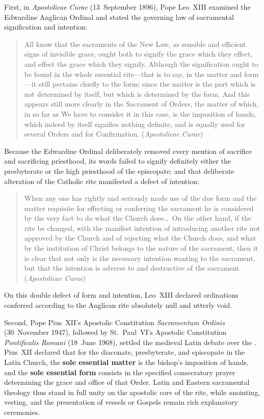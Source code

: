 First, in \emph{Apostolicae Curae} (13~September 1896), Pope Leo~XIII examined the Edwardine Anglican Ordinal and stated the governing law of sacramental signification and intention:
\begin{quotation}
All know that the sacraments of the New Law, as sensible and efficient signs of invisible grace, ought both to signify the grace which they effect, and effect the grace which they signify. Although the signification ought to be found in the whole essential rite---that is to say, in the matter and form---it still pertains chiefly to the form; since the matter is the part which is not determined by itself, but which is determined by the form. And this appears still more clearly in the Sacrament of Orders, the matter of which, in so far as We have to consider it in this case, is the imposition of hands, which indeed by itself signifies nothing definite, and is equally used for several Orders and for Confirmation. (\emph{Apostolicae Curae})
\end{quotation}
Because the Edwardine Ordinal deliberately removed every mention of sacrifice and sacrificing priesthood, its words failed to signify definitely either the presbyterate or the high priesthood of the episcopate; and that deliberate alteration of the Catholic rite manifested a defect of intention:
\begin{quotation}
When any one has rightly and seriously made use of the due form and the matter requisite for effecting or conferring the sacrament he is considered by the very fact to do what the Church does\ldots\ On the other hand, if the rite be changed, with the manifest intention of introducing another rite not approved by the Church and of rejecting what the Church does, and what by the institution of Christ belongs to the nature of the sacrament, then it is clear that not only is the necessary intention wanting to the sacrament, but that the intention is adverse to and destructive of the sacrament. (\emph{Apostolicae Curae})
\end{quotation}
On this double defect of form and intention, Leo~XIII declared ordinations conferred according to the Anglican rite absolutely null and utterly void.

Second, Pope Pius~XII's Apostolic Constitution \emph{Sacramentum Ordinis} (30~November 1947), followed by St.~Paul~VI's Apostolic Constitution \emph{Pontificalis Romani} (18~June 1968), settled the medieval Latin debate over the . Pius~XII declared that for the diaconate, presbyterate, and episcopate in the Latin Church, the \textbf{sole essential matter} is the bishop's imposition of hands, and the \textbf{sole essential form} consists in the specified consecratory prayer determining the grace and office of that Order. Latin and Eastern sacramental theology thus stand in full unity on the apostolic core of the rite, while anointing, vesting, and the presentation of vessels or Gospels remain rich explanatory ceremonies.

